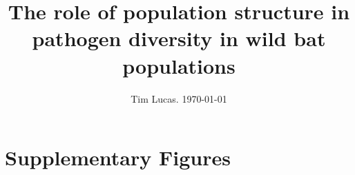 \documentclass[a4paper,10pt,reqno]{amsart}
\begin{document}
\title{The role of population structure in pathogen diversity in wild bat populations}
\author{Tim Lucas. \today}
\date{}


\maketitle

\tableofcontents





\clearpage
\appendix
\section{Supplementary Figures}






\small
\printbibliography 
\end{document}

